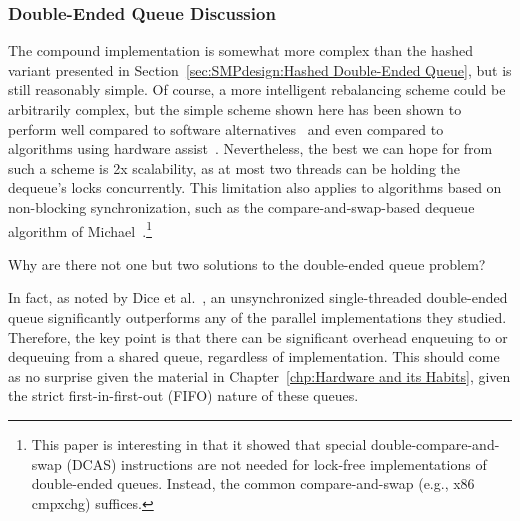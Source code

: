 \subsubsection{Double-Ended Queue Discussion}
\label{sec:SMPdesign:Double-Ended Queue Discussion}

The compound implementation is somewhat more complex than the
hashed variant presented in
Section~\ref{sec:SMPdesign:Hashed Double-Ended Queue},
but is still reasonably simple.
Of course, a more intelligent rebalancing scheme could be arbitrarily
complex, but the simple scheme shown here has been shown to
perform well compared to software
alternatives~\cite{LukeDalessandro:2011:ASPLOS:HybridNOrecSTM:deque}
and even compared to algorithms using hardware
assist~\cite{DavidDice:2010:SCA:HTM:deque}.
Nevertheless, the best we can hope for from such a scheme
is 2x scalability, as at most two threads can be holding the
dequeue's locks concurrently.
This limitation also applies to algorithms based on non-blocking
synchronization, such as the compare-and-swap-based dequeue algorithm of
Michael~\cite{DBLP:conf/europar/Michael03}.\footnote{
	This paper is interesting in that it showed that special
	double-compare-and-swap (DCAS) instructions are not needed
	for lock-free implementations of double-ended queues.
	Instead, the common compare-and-swap (e.g., x86 cmpxchg)
	suffices.}

\QuickQuiz{}
	Why are there not one but two solutions to the double-ended queue
	problem?
 \QuickQuizEnd

In fact, as noted by Dice et al.~\cite{DavidDice:2010:SCA:HTM:deque},
an unsynchronized single-threaded double-ended queue significantly
outperforms any of the parallel implementations they studied.
Therefore, the key point is that there can be significant overhead enqueuing to
or dequeuing from a shared queue, regardless of implementation.
This should come as no surprise given the material in
Chapter~\ref{chp:Hardware and its Habits}, given the strict
first-in-first-out (FIFO) nature of these queues.

